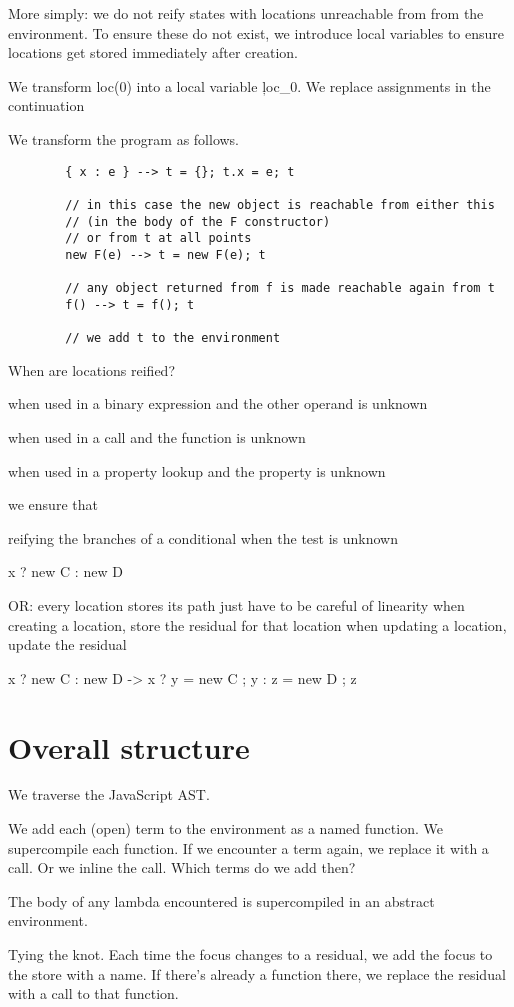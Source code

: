 More simply: we do not reify states with locations unreachable from
from the environment. To ensure these do not exist, we introduce
local variables to ensure locations get stored immediately after creation.

We transform loc(0) into a local variable \c{loc_0}.
We replace assignments in the continuation 

We transform the program as follows.

\begin{verbatim}
        { x : e } --> t = {}; t.x = e; t

        // in this case the new object is reachable from either this
        // (in the body of the F constructor)
        // or from t at all points
        new F(e) --> t = new F(e); t

        // any object returned from f is made reachable again from t
        f() --> t = f(); t

        // we add t to the environment
\end{verbatim}

When are locations reified?

        when used in a binary expression and the other operand
        is unknown

        when used in a call and the function is unknown

        when used in a property lookup and the property is unknown

        we ensure that 

        reifying the branches of a conditional when the test is unknown

                x ? new C : new D

OR:
        every location stores its path
        just have to be careful of linearity
        when creating a location, store the residual for that location
        when updating a location, update the residual

                x ? new C : new D
        ->
                x ? { y = new C ; y }
                  : { z = new D ; z }


\section{Overall structure}

We traverse the JavaScript AST.

We add each (open) term to the environment as a named function.
We supercompile each function.
If we encounter a term again, we replace it with a call.
Or we inline the call.
Which terms do we add then?

The body of any lambda encountered is supercompiled in an abstract
environment.

Tying the knot.
Each time the focus changes to a residual, we add the focus to the store with
a name. If there's already a function there, we replace the residual with a
call to that function.



